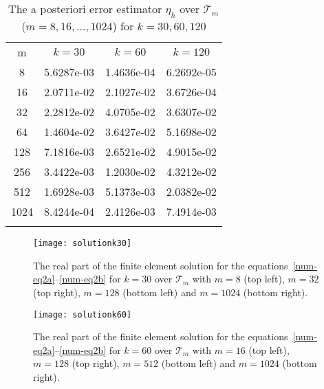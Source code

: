 \documentclass[leqno,final]{siamltex}
\numberwithin{equation}{section}
\newcommand{\T}{\mathcal{T}}
\begin{document}
\begin{table}
\begin{center}
\begin{tabular}{|c|c|c|c|}
\hline\noalign{\smallskip}
m  & $k=30$ & $k=60$ & $k=120$  \\
\noalign{\smallskip}\hline\noalign{\smallskip}
8 &    5.6287e-03 & 1.4636e-04 & 6.2692e-05\\
16 &    2.0711e-02 & 2.1027e-02 & 3.6726e-04\\
32 &   2.2812e-02 & 4.0705e-02 & 3.6307e-02\\
64 &   1.4604e-02 & 3.6427e-02 & 5.1698e-02\\
128 &  7.1816e-03 & 2.6521e-02 & 4.9015e-02\\
256 &  3.4422e-03 & 1.2030e-02 & 4.3212e-02\\
512 &  1.6928e-03 & 5.1373e-03 & 2.0382e-02\\
1024 & 8.4244e-04 & 2.4126e-03 & 7.4914e-03\\
\noalign{\smallskip}\hline
\end{tabular}
\caption{ The a posteriori error estimator $\eta_h$ over $\T_m$ ($m=8,16,\ldots,1024$) for $k=30,60,120$}
\label{tab5}
\end{center}
\end{table}

\begin{figure}[htbp]
\begin{center}
\texttt{[image: solutionk30]}
\caption{The real part of the finite element solution for the equations~\eqref{num-eq2a}--\eqref{num-eq2b} for $k=30$ over $\T_m$ with $m=8$ (top left), $m=32$ (top right), $m=128$ (bottom left) and $m=1024$ (bottom right).}
\label{num-fig5}
\end{center}
\end{figure}

\begin{figure}[htbp]
\begin{center}
\texttt{[image: solutionk60]}
\caption{The real part of the finite element solution for the equations~\eqref{num-eq2a}--\eqref{num-eq2b} for $k=60$ over $\T_m$ with $m=16$ (top left), $m=128$ (top right), $m=512$ (bottom left) and $m=1024$ (bottom right).}
\label{num-fig6}
\end{center}
\end{figure}
\end{document}
